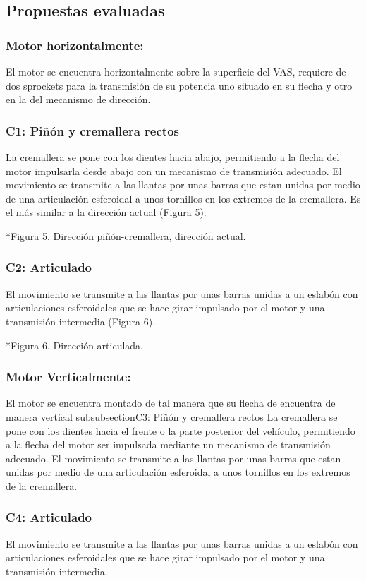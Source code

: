 \subsection{Propuestas evaluadas}
\subsubsection{Motor horizontalmente:}
El motor se encuentra horizontalmente sobre la superficie del VAS, requiere de dos sprockets para la transmisión de su potencia uno situado en su flecha y otro en la del mecanismo de dirección. 
\subsubsection{C1: Piñón y cremallera rectos}
La cremallera se pone con los dientes hacia abajo, permitiendo a la flecha del motor impulsarla desde abajo con un mecanismo de transmisión adecuado. El movimiento se transmite a las llantas por unas barras que estan unidas por medio de una articulación esferoidal a unos tornillos en los extremos de la cremallera. Es el más similar a la dirección actual (Figura 5).

*Figura 5. Dirección piñón-cremallera, dirección actual.

\subsubsection{C2: Articulado}

El movimiento se transmite a las llantas por unas barras unidas a un eslabón con articulaciones esferoidales que se hace girar impulsado por el motor y una transmisión intermedia (Figura 6).

*Figura 6. Dirección articulada.

\subsubsection{Motor Verticalmente:}
El motor se encuentra montado de tal manera que su flecha de encuentra de manera vertical
subsubsection{C3: Piñón y cremallera rectos}
La cremallera se pone con los dientes hacia el frente o la parte posterior del vehículo, permitiendo a la flecha del motor ser impulsada mediante un mecanismo de transmisión adecuado. El movimiento se transmite a las llantas por unas barras que estan unidas por medio de una articulación esferoidal a unos tornillos en los extremos de la cremallera.
\subsubsection{C4: Articulado}
El movimiento se transmite a las llantas por unas barras unidas a un eslabón con articulaciones esferoidales que se hace girar impulsado por el motor y una transmisión intermedia.

